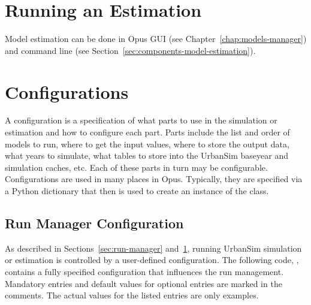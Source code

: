 \section{Running an Estimation}
\label{sec:running-estimation}
Model estimation can be done in Opus GUI (see
Chapter~\ref{chap:models-manager}) and command line (see
Section~\ref{sec:components-model-estimation}).

\section{Configurations}
\label{sec:configuration}
%
A configuration is a specification of what parts to use in the simulation or estimation
and how to configure each part.  Parts include the list and order of models to
run, where to get the input values, where to store the output data, what years
to simulate, what tables to store into the UrbanSim baseyear and simulation
caches, etc. Each of these parts in
turn may be configurable. Configurations are used in many places in Opus.  Typically, they are specified
via a Python dictionary that then is used to create an instance of the
 class.

\subsection{Run Manager Configuration}
\label{sec:run-manager-configuration}

As described in Sections~\ref{sec:run-manager} and~\ref{sec:running-estimation}, 
running UrbanSim simulation or estimation is controlled by a user-defined
configuration. The following code, , contains a fully specified configuration
that influences the run management. Mandatory entries and default
values for optional entries are marked in the comments. The actual values for
the listed entries are only examples.

